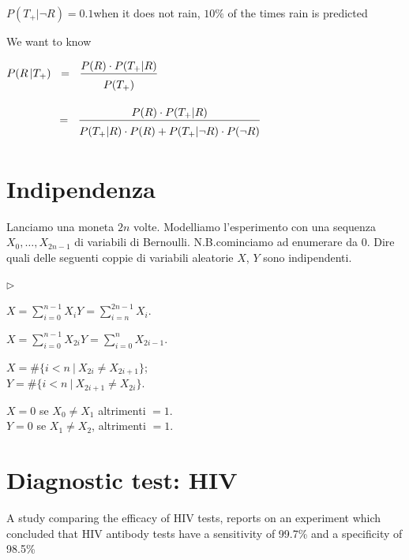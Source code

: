 \documentclass[12pt,openany]{book}
\newcommand{\mylabel}[1]{{\footnotesize\textsf{#1}}\hfill}
\renewenvironment{itemize}
  {\begin{list}{$\triangleright$}{%
   \setlength{\parskip}{0mm}
   \setlength{\topsep}{.2\baselineskip}
   \setlength{\rightmargin}{0mm}
   \setlength{\listparindent}{0mm}
   \setlength{\itemindent}{0mm}
   \setlength{\labelwidth}{3ex}
   \setlength{\itemsep}{.4\baselineskip}
   \setlength{\parsep}{0mm}
   \setlength{\partopsep}{0mm}
   \setlength{\labelsep}{1ex}
   \setlength{\leftmargin}{\labelwidth+\labelsep}
   \let\makelabel\mylabel}}{%
   \end{list}\vspace*{-1.3mm}}
\theoremstyle{mio}
\theoremstyle{liscio}
\begin{document}
$P (T_+|\neg R) = 0.1$\hfill when it does not rain, $10\%$ of the times rain is predicted

\bigskip
We want to know

$\displaystyle P(R\,| T_+)\medrel{=}\frac{P(R)\cdot P(T_+|R)}{P(T_+)\vphantom{\Big[}}$

$\displaystyle\hphantom{P(R | T_+)}\medrel{=}\frac{P(R)\cdot P(T_+|R)}{P(T_+|R)\cdot P(R)+ P(T_+|\neg R)\cdot P(\neg R)\vphantom{\Big[}}$


\clearpage\section{Indipendenza}
\label{esercizio_indipendenza}

Lanciamo una moneta $2n$ volte. Modelliamo l'esperimento con una sequenza $X_0,\dots,X_{2n-1}$ di variabili di Bernoulli. N.B.\@ cominciamo ad enumerare da $0$. Dire quali delle seguenti coppie di variabili aleatorie $X$, $Y$ sono indipendenti.\medskip

\begin{itemize}
\item[1.] $\displaystyle X=\sum_{i=0}^{n-1}X_i$\qquad $\displaystyle Y=\sum_{i=n}^{2n-1}X_i$.


\item[2.] $\displaystyle X=\sum_{i=0}^{n-1}X_{2i}$\qquad $\displaystyle Y=\sum_{i=0}^{n} X_{2i-1}$.\bigskip

\item[3.] $X= \#\big\{i<n\ |\ X_{2i}\neq X_{2i+1}\big\}$;\\
$Y= \#\big\{i<n\ |\ X_{2i+1}\neq X_{2i}\big\}$.\bigskip

\item[4.] $X=0$ se $X_0\neq X_1$ altrimenti $=1$. \\
$Y=0$ se $X_1\neq X_2$, altrimenti $=1$.

\end{itemize}



\clearpage\section{Diagnostic test: HIV}
\label{HIV_test}

A study comparing the efficacy of HIV tests, reports on an
experiment which concluded that HIV antibody tests have a
{\color{violet}sensitivity of 99.7\%} and a {\color{violet}specificity of 98.5\%}
\end{document}
